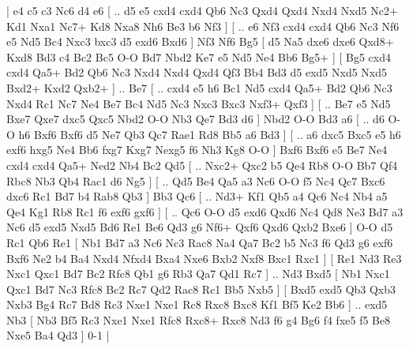 \makegametitle 
|   e4   c5    c3   Nc6    d4   e6 [ .. d5  e5 cxd4  cxd4 Qb6  Nc3 Qxd4  Qxd4 Nxd4  Nxd5 Nc2+  Kd1 Nxa1  Nc7+ Kd8  Nxa8 Nh6  Be3 b6  Nf3   ]  [ .. e6  Nf3 cxd4  cxd4 Qb6  Nc3 Nf6  e5 Nd5  Bc4 Nxc3  bxc3 d5  exd6 Bxd6   ]  Nf3   Nf6   Bg5 [  d5 Na5  dxe6 dxe6  Qxd8+ Kxd8  Bd3 c4  Bc2 Bc5  O-O Bd7  Nbd2 Ke7  e5 Nd5  Ne4 Bb6  Bg5+   ]  [  Bg5 cxd4  cxd4 Qa5+  Bd2 Qb6  Nc3 Nxd4  Nxd4 Qxd4  Qf3 Bb4  Bd3 d5  exd5 Nxd5  Nxd5 Bxd2+  Kxd2 Qxb2+   ] .. Be7 [ .. cxd4  e5 h6  Bc1 Nd5  cxd4 Qa5+  Bd2 Qb6  Nc3 Nxd4  Rc1 Nc7  Ne4 Be7  Bc4 Nd5  Nc3 Nxc3  Bxc3 Nxf3+  Qxf3   ]  [ .. Be7  e5 Nd5  Bxe7 Qxe7  dxc5 Qxc5  Nbd2 O-O  Nb3 Qe7  Bd3 d6   ]  Nbd2   O-O    Bd3   a6 [ .. d6  O-O h6  Bxf6 Bxf6  d5 Ne7  Qb3 Qc7  Rae1 Rd8  Bb5 a6  Bd3   ]  [ .. a6  dxc5 Bxc5  e5 h6  exf6 hxg5  Ne4 Bb6  fxg7 Kxg7  Nexg5 f6  Nh3 Kg8  O-O   ]  Bxf6   Bxf6    e5   Be7    Ne4   cxd4    cxd4   Qa5+    Ned2   Nb4    Bc2   Qd5 [ .. Nxc2+  Qxc2 b5  Qe4 Rb8  O-O Bb7  Qf4 Rbc8  Nb3 Qb4  Rac1 d6  Ng5   ]  [ .. Qd5  Be4 Qa5  a3 Nc6  O-O f5  Nc4 Qc7  Bxc6 dxc6  Rc1 Bd7  b4 Rab8  Qb3   ]  Bb3   Qc6 [ .. Nd3+  Kf1 Qb5  a4 Qc6  Nc4 Nb4  a5 Qe4  Kg1 Rb8  Rc1 f6  exf6 gxf6   ]  [ .. Qc6  O-O d5  exd6 Qxd6  Nc4 Qd8  Ne3 Bd7  a3 Nc6  d5 exd5  Nxd5 Bd6  Re1 Be6  Qd3 g6  Nf6+ Qxf6  Qxd6 Qxb2  Bxe6   ]  O-O   d5    Rc1   Qb6    Re1 [  Nb1 Bd7  a3 Nc6  Nc3 Rac8  Na4 Qa7  Bc2 b5  Nc3 f6  Qd3 g6  exf6 Bxf6  Ne2 b4  Ba4 Nxd4  Nfxd4 Bxa4  Nxe6 Bxb2  Nxf8 Bxc1  Rxc1   ]  [  Re1 Nd3  Re3 Nxc1  Qxc1 Bd7  Bc2 Rfc8  Qb1 g6  Rb3 Qa7  Qd1 Rc7   ] .. Nd3    Bxd5 [  Nb1 Nxc1  Qxc1 Bd7  Nc3 Rfc8  Bc2 Rc7  Qd2 Rac8  Rc1 Bb5  Nxb5   ]  [  Bxd5 exd5  Qb3 Qxb3  Nxb3 Bg4  Rc7 Bd8  Rc3 Nxe1  Nxe1 Rc8  Rxc8 Bxc8  Kf1 Bf5  Ke2 Bb6   ] .. exd5    Nb3    [  Nb3 Bf5  Rc3 Nxe1  Nxe1 Rfc8  Rxc8+ Rxc8  Nd3 f6  g4 Bg6  f4 fxe5  f5 Be8  Nxe5 Ba4  Qd3   ] 0-1  |
